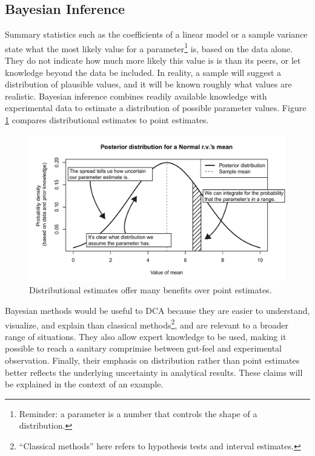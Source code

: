 \documentclass[11pt,a4paper,article]{memoir} %
\begin{document}
\subsection*{Bayesian Inference}
Summary statistics such as the coefficients of a linear model or a sample variance state what the most likely value for a parameter\footnote{Reminder: a parameter is a number that controls the shape of a distribution.} is, based on the data alone. They do not indicate how much more likely this value is is than its peers, or let knowledge beyond the data be included. In reality, a sample will suggest a distribution of plausible values, and it will be known roughly what values are realistic. Bayesian inference combines readily available knowledge with experimental data to estimate a distribution of possible parameter values. Figure \ref{fig:annotated_posterior} compares distributional estimates to point estimates.
\begin{figure}[b]
\includegraphics[width=\textwidth]{annotated_posterior.pdf}
\caption{Distributional estimates offer many benefits over point estimates.}
\label{fig:annotated_posterior}
\end{figure}
\par
Bayesian methods would be useful to DCA because they are easier to understand, visualize, and explain than classical methods\footnote{``Classical methods'' here refers to  hypothesis tests and interval estimates.}, and are relevant to a broader range of situations. They also allow expert knowledge to be used, making it possible to reach a sanitary comprimise between gut-feel and experimental observation. Finally, their emphasis on distribution rather than point estimates better reflects the underlying uncertainty in analytical results. These claims will  be explained in the context of an example.
\end{document}
